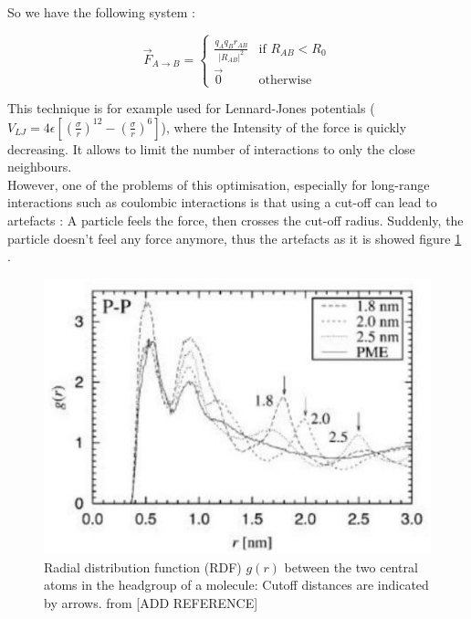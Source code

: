 \documentclass[12pt,twoside,a4paper]{report}
\begin{document}
So we have the following system :


\begin{equation}
  \overrightarrow{F}_{A \rightarrow B}  =
	\begin{cases}
	  \frac{q_A q_B \hat{r}_{AB} }{|R_{AB}|^2}  & \text{if } R_{AB} < R_0 \\
	  \overrightarrow{0} & \text{otherwise}
	\end{cases}
\end{equation}

This technique is for example used for Lennard-Jones potentials ($V_{LJ} = 4\epsilon [(\frac{\sigma}{r})^12 - (\frac{\sigma}{r})^6] $), where the Intensity of the force is quickly decreasing. It allows to limit the number of interactions to only the close neighbours.\\

However, one of the problems of this optimisation, especially for long-range interactions such as coulombic interactions is that using a cut-off can lead to artefacts : A particle feels the force, then crosses the cut-off radius. Suddenly, the particle doesn't feel any force anymore, thus the artefacts as it is showed figure \ref{fig:artefact} .

\begin{figure}[H]

\includegraphics[scale=0.8]{artefact}
 \centering
 
\caption{Radial distribution function (RDF) $g(r)$ between the two
central atoms in the headgroup of a molecule: Cutoff distances are indicated by arrows. from [ADD REFERENCE]}

\label{fig:artefact}

\end{figure}
\end{document}
